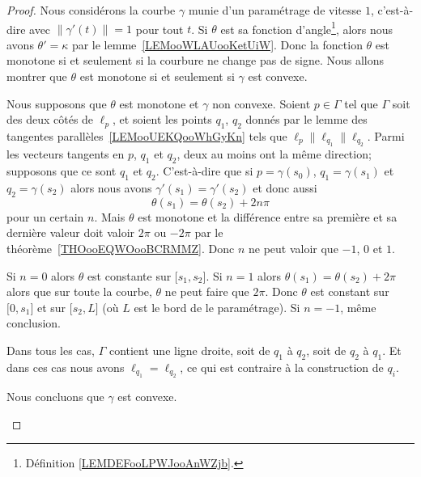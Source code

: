 \begin{proof}
	Nous considérons la courbe \( \gamma\) munie d'un paramétrage de vitesse \( 1\), c'est-à-dire avec \( \| \gamma'(t) \|=1\) pour tout \( t\). Si \( \theta\) est sa fonction d'angle\footnote{Définition \ref{LEMDEFooLPWJooAnWZjb}.}, alors nous avons \( \theta'=\kappa\) par le lemme~\ref{LEMooWLAUooKetUiW}. Donc la fonction \( \theta\) est monotone si et seulement si la courbure ne change pas de signe. Nous allons montrer que \( \theta\) est monotone si et seulement si \( \gamma\) est convexe.

	\begin{subproof}
		\spitem[\( \Rightarrow\)]

		Nous supposons que \( \theta\) est monotone et \( \gamma\) non convexe. Soient \( p\in \Gamma\) tel que \( \Gamma\) soit des deux côtés de \( \ell_p\), et soient les points \( q_1\), \( q_2\) donnés par le lemme des tangentes parallèles~\ref{LEMooUEKQooWhGyKn} tels que \( \ell_p\parallel\ell_{q_1}\parallel\ell_{q_2}\). Parmi les vecteurs tangents en \( p\), \( q_1\) et \( q_2\), deux au moins ont la même direction; supposons que ce sont \( q_1\) et \( q_2\). C'est-à-dire que si \( p=\gamma(s_0)\), \( q_1=\gamma(s_1)\) et \( q_2=\gamma(s_2)\) alors nous avons \( \gamma'(s_1)=\gamma'(s_2)\) et donc aussi
		\begin{equation}
			\theta(s_1)=\theta(s_2)+2n\pi
		\end{equation}
		pour un certain \( n\). Mais \( \theta\) est monotone et la différence entre sa première et sa dernière valeur doit valoir \( 2\pi\) ou \( -2\pi\) par le théorème~\ref{THOooEQWOooBCRMMZ}. Donc \( n\) ne peut valoir que \( -1\), \( 0\) et \( 1\).

		Si \( n=0\) alors \( \theta\) est constante sur \( \mathopen[ s_1 , s_2 \mathclose]\). Si \( n=1\) alors \( \theta(s_1)=\theta(s_2)+2\pi\) alors que sur toute la courbe, \( \theta\) ne peut faire que \( 2\pi\). Donc \( \theta\) est constant sur \( \mathopen[ 0 , s_1 \mathclose]\) et sur \( \mathopen[ s_2 , L \mathclose]\) (où \( L\) est le bord de le paramétrage). Si \( n=-1\), même conclusion.

		Dans tous les cas, \( \Gamma\) contient une ligne droite, soit de \( q_1\) à \( q_2\), soit de \( q_2\) à \( q_1\). Et dans ces cas nous avons \( \ell_{q_1}=\ell_{q_2}\), ce qui est contraire à la construction de \( q_i\).

		Nous concluons que \( \gamma\) est convexe.

		\spitem[\( \Leftarrow\)]


\end{subproof}
\end{proof}
